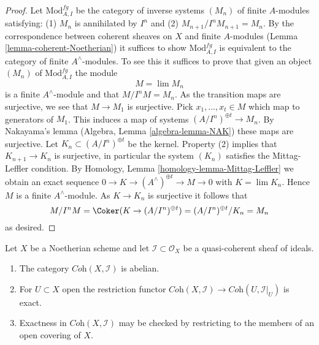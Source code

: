 \begin{proof}
Let $\text{Mod}^{fg}_{A, I}$ be the category of inverse systems $(M_n)$
of finite $A$-modules satisfying: (1) $M_n$ is annihilated by $I^n$ and (2)
$M_{n + 1}/I^nM_{n + 1} = M_n$. By the correspondence between coherent
sheaves on $X$ and finite $A$-modules (Lemma \ref{lemma-coherent-Noetherian})
it suffices to show $\text{Mod}^{fg}_{A, I}$ is equivalent to the category of
finite $A^\wedge$-modules. To see this it suffices to prove that given
an object $(M_n)$ of $\text{Mod}^{fg}_{A, I}$ the module
$$
M = \lim M_n
$$
is a finite $A^\wedge$-module and that $M/I^nM = M_n$. As the transition
maps are surjective, we see that $M \to M_1$ is surjective.
Pick $x_1, \ldots, x_t \in M$ which map to generators of $M_1$.
This induces a map of systems $(A/I^n)^{\oplus t} \to M_n$.
By Nakayama's lemma (Algebra, Lemma \ref{algebra-lemma-NAK}) these maps are
surjective. Let $K_n \subset (A/I^n)^{\oplus t}$ be the kernel.
Property (2) implies that $K_{n + 1} \to K_n$ is surjective, in particular
the system $(K_n)$ satisfies the Mittag-Leffler condition.
By Homology, Lemma \ref{homology-lemma-Mittag-Leffler}
we obtain an exact sequence
$0 \to K \to (A^\wedge)^{\oplus t} \to M \to 0$
with $K = \lim K_n$.
Hence $M$ is a finite $A^\wedge$-module.
As $K \to K_n$ is surjective it follows that
$$
M/I^nM = \Coker(K \to (A/I^n)^{\oplus t}) =
(A/I^n)^{\oplus t}/K_n = M_n
$$
as desired.
\end{proof}

\begin{lemma}
\label{lemma-inverse-systems-abelian}
Let $X$ be a Noetherian scheme and let $\mathcal{I} \subset \mathcal{O}_X$
be a quasi-coherent sheaf of ideals.
\begin{enumerate}
\item The category $\textit{Coh}(X, \mathcal{I})$ is abelian.
\item For $U \subset X$ open the restriction functor
$\textit{Coh}(X, \mathcal{I}) \to \textit{Coh}(U, \mathcal{I}|_U)$
is exact.
\item Exactness in $\textit{Coh}(X, \mathcal{I})$ may be checked by
restricting to the members of an open covering of $X$.
\end{enumerate}
\end{lemma}


